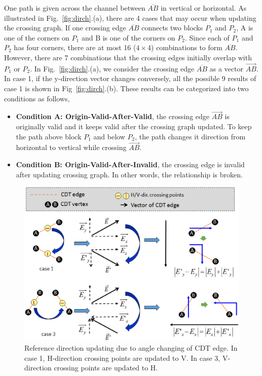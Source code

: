      
    One path is given across the channel between $\overline{AB}$ in vertical or horizontal. As illustrated in Fig.~\ref{fig:dirch}.(a), there are 4 cases that may occur when updating the crossing graph. If one crossing edge $\overline{AB}$ connects two blocks $P_1$ and $P_2$, A is one of the corners on $P_1$ and B is one of the corners on $P_2$. Since each of $P_1$ and $P_2$ has four corners, there are at most 16 ($4\times 4$) combinations to form $\overline{AB}$. However, there are 7 combinations that the crossing edges initially overlap with $P_1$ or $P_2$. In Fig.~\ref{fig:dirch}.(a), we consider the crossing edge $\overline{AB}$ as a vector $\overrightarrow{AB}$. In case 1, if the y-direction vector changes conversely, all the possible 9 results of case 1 is shown in Fig~\ref{fig:dirch}.(b). These results can be categorized into two conditions as follows,
    \begin{itemize}
      \item{\bf Condition A: Origin-Valid-After-Valid}, the crossing edge $\overrightarrow{AB}$ is originally valid and it keeps valid after the crossing graph updated. To keep the path above block $P_1$ and below $P_2$, the path changes it direction from horizontal to vertical while crossing $\overrightarrow{AB}$.
      \item{\bf Condition B: Origin-Valid-After-Invalid}, the crossing edge is invalid after updating crossing graph. In other words, the relationship is broken.
    \end{itemize}

    \begin{figure}[t]
      \begin{center}
        \includegraphics[width=\textwidth]{Fig/refdir3.eps}
        \caption{Reference direction updating due to angle changing of CDT edge.
         In case 1, H-direction crossing points are updated to V. 
           In case 3, V-direction crossing points are updated to H.}
        \label{fig:refdir}
      \end{center}
    \end{figure}

